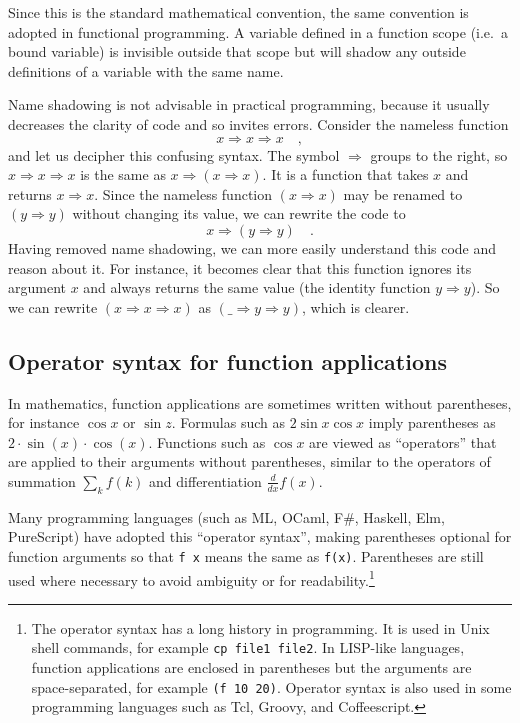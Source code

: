 Since this is the standard mathematical convention, the same convention
is adopted in functional programming. A variable defined in a function
scope (i.e.\ a bound variable) is invisible outside that scope but
will shadow any outside definitions of a variable with the same name.

Name shadowing is not advisable in practical
programming, because it usually decreases the clarity of code and
so invites errors. Consider the nameless function
\[
x\Rightarrow x\Rightarrow x\quad,
\]
and let us decipher this confusing syntax. The symbol $\Rightarrow$
groups to the right, so $x\Rightarrow x\Rightarrow x$ is the same
as $x\Rightarrow\left(x\Rightarrow x\right)$. It is a function that
takes $x$ and returns $x\Rightarrow x$. Since the nameless function
$\left(x\Rightarrow x\right)$ may be renamed to $\left(y\Rightarrow y\right)$
without changing its value, we can rewrite the code to
\[
x\Rightarrow\left(y\Rightarrow y\right)\quad.
\]
Having removed name shadowing, we can more easily understand this
code and reason about it. For instance, it becomes clear that this
function ignores its argument $x$ and always returns the same value
(the identity function $y\Rightarrow y$). So we can rewrite $\left(x\Rightarrow x\Rightarrow x\right)$
as $\left(\_\Rightarrow y\Rightarrow y\right)$, which is clearer.

\subsection{Operator syntax for function applications}

In mathematics, function applications are sometimes written without
parentheses, for instance $\cos x$ or $\sin z$. Formulas such as
$2\sin x\cos x$ imply parentheses as $2\cdot\sin\left(x\right)\cdot\cos\left(x\right)$.
Functions such as $\cos x$ are viewed as ``operators'' that are
applied to their arguments without parentheses, similar to the operators
of summation $\sum_{k}f(k)$ and differentiation $\frac{d}{dx}f(x)$.

Many programming languages (such as ML, OCaml, F\#, Haskell, Elm,
PureScript) have adopted this ``operator syntax'',
making parentheses optional for function arguments so that \lstinline!f x!
means the same as \lstinline!f(x)!. Parentheses are still used where
necessary to avoid ambiguity or for readability.\footnote{The operator syntax has a long history in programming. It is used
in Unix shell commands, for example \lstinline!cp file1 file2!. In
LISP-like languages, function applications are enclosed in parentheses
but the arguments are space-separated, for example \lstinline!(f 10 20)!.
Operator syntax is also used in some programming languages such as
Tcl, Groovy, and Coffeescript.}

